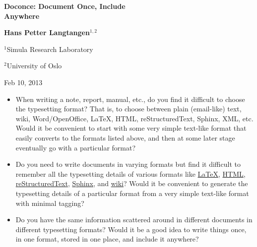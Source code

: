 \documentclass[%
oneside,                 %
final,                   %
10pt]{article}
\begin{document}






\begin{center}
{\LARGE\bf Doconce: Document Once, Include \\ [1.5mm] Anywhere}
\end{center}





\begin{center}
{\bf Hans Petter Langtangen${}^{1, 2}$} \\ [0mm]
\end{center}

\begin{center}
\centerline{{\small ${}^1$Simula Research Laboratory}}
\centerline{{\small ${}^2$University of Oslo}}
\end{center}




\begin{center}
Feb 10, 2013
\end{center}

\vspace{1cm}



\begin{itemize}
 \item When writing a note, report, manual, etc., do you find it difficult
   to choose the typesetting format? That is, to choose between plain
   (email-like) text, wiki, Word/OpenOffice, {\LaTeX}, HTML,
   reStructuredText, Sphinx, XML, etc.  Would it be convenient to
   start with some very simple text-like format that easily converts
   to the formats listed above, and then at some later stage
   eventually go with a particular format?

 \item Do you need to write documents in varying formats but find it
   difficult to remember all the typesetting details of various
   formats like \href{{http://refcards.com/docs/silvermanj/amslatex/LaTeXRefCard.v2.0.pdf}}{LaTeX}, \href{{http://www.htmlcodetutorial.com/}}{HTML}, \href{{http://docutils.sourceforge.net/docs/ref/rst/restructuredtext.html}}{reStructuredText}, \href{{http://sphinx.pocoo.org/contents.html}}{Sphinx}, and \href{{http://code.google.com/p/support/wiki/WikiSyntax}}{wiki}? Would it be convenient
   to generate the typesetting details of a particular format from a
   very simple text-like format with minimal tagging?

 \item Do you have the same information scattered around in different
   documents in different typesetting formats? Would it be a good idea
   to write things once, in one format, stored in one place, and
   include it anywhere?
\end{itemize}
\end{document}
